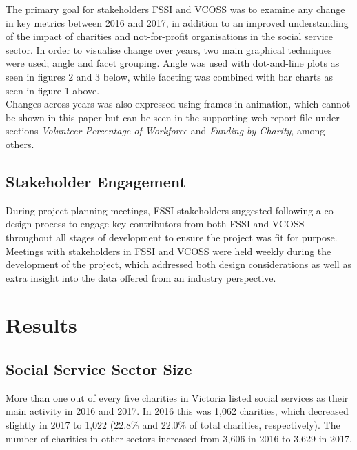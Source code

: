\documentclass[
  11pt,
]{article}
\begin{document}
The primary goal for stakeholders FSSI and VCOSS was to examine any change in key metrics between 2016 and 2017, in addition to an improved understanding of the impact of charities and not-for-profit organisations in the social service sector. In order to visualise change over years, two main graphical techniques were used; angle and facet grouping. Angle was used with dot-and-line plots as seen in figures 2 and 3 below, while faceting was combined with bar charts as seen in figure 1 above.\\
Changes across years was also expressed using frames in animation, which cannot be shown in this paper but can be seen in the supporting web report file under sections \emph{Volunteer Percentage of Workforce} and \emph{Funding by Charity}, among others.

\hypertarget{stakeholder-engagement}{%
\subsection{Stakeholder Engagement}\label{stakeholder-engagement}}

During project planning meetings, FSSI stakeholders suggested following a co-design process to engage key contributors from both FSSI and VCOSS throughout all stages of development to ensure the project was fit for purpose. Meetings with stakeholders in FSSI and VCOSS were held weekly during the development of the project, which addressed both design considerations as well as extra insight into the data offered from an industry perspective.

\newpage

\hypertarget{results}{%
\section{Results}\label{results}}

\hypertarget{social-service-sector-size}{%
\subsection{Social Service Sector Size}\label{social-service-sector-size}}

More than one out of every five charities in Victoria listed social services as their main activity in 2016 and 2017. In 2016 this was 1,062 charities, which decreased slightly in 2017 to 1,022 (22.8\% and 22.0\% of total charities, respectively). The number of charities in other sectors increased from 3,606 in 2016 to 3,629 in 2017.
\end{document}
